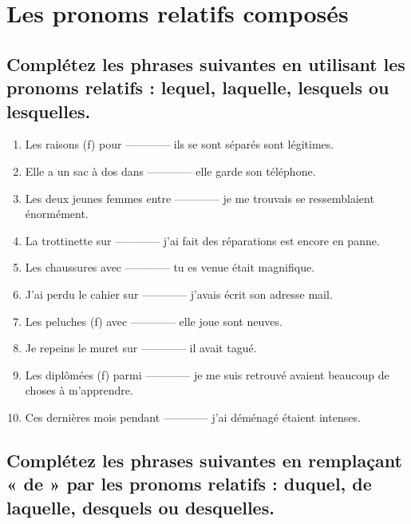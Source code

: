 \documentclass[12pt]{article}
\begin{document}
\section{Les pronoms relatifs composés} 
\subsection{Complétez les phrases suivantes en utilisant les pronoms relatifs : lequel, laquelle, lesquels ou lesquelles.} 
\begin{enumerate}
\item Les raisons (f) pour ------------ ils se sont séparés sont légitimes. \item Elle a un sac à dos dans ------------ elle garde son téléphone. \item Les deux jeunes femmes entre ------------ je me trouvais se ressemblaient énormément. \item La trottinette sur ------------ j’ai fait des réparations est encore en panne. \item Les chaussures avec ------------ tu es venue était magnifique. \item J’ai perdu le cahier sur ------------ j’avais écrit son adresse mail. \item Les peluches (f) avec ------------ elle joue sont neuves. \item Je repeins le muret sur ------------ il avait tagué. \item Les diplômées (f) parmi ------------ je me suis retrouvé avaient beaucoup de choses à m’apprendre. \item Ces dernières mois pendant ------------ j’ai déménagé étaient intenses.
\end{enumerate}


\subsection{Complétez les phrases suivantes en remplaçant « de » par les pronoms relatifs : duquel, de laquelle, desquels ou desquelles.}
\end{document}
